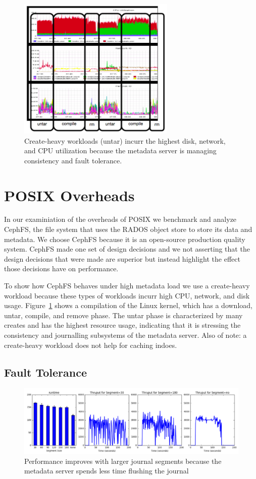\documentclass[preprint]{sigplanconf-eurosys}
\begin{document}
\begin{figure}[tb]
\centering
\includegraphics[width=75mm]{figures/creates-motivation.png}
\caption{Create-heavy workloads (untar) incurr the highest disk, network, and CPU
utilization because the metadata server is managing consistency and fault
tolerance.}\label{fig:creates-motivation}
\end{figure}

\section{POSIX Overheads}

In our examiniation of the overheads of POSIX we benchmark and analyze CephFS,
the file system that uses the RADOS object store to store its data and
metadata. We choose CephFS because it is an open-source production quality
system. CephFS made one set of design decisions and we not asserting that the
design decisions that were made are superior but instead highlight the
effect those decisions have on performance.

To show how CephFS behaves under high metadata load we use a create-heavy
workload because these types of workloads incurr high CPU, network, and disk
usage.  Figure~\ref{fig:creates-motivation} shows a compilation of the Linux
kernel, which has a download, untar, compile, and remove phase. The untar phase
is characterized by many creates and has the highest resource usage, indicating
that it is stressing the consistency and journalling subsystems of the metadata
server. Also of note: a create-heavy workload does not help for caching indoes.

\subsection{Fault Tolerance}
\begin{figure}[tb]%
\centering
\includegraphics[width=180mm]{figures/throughput-journal.png}
\caption{Performance improves with larger journal segments because the metadata
server spends less time flushing the journal }\label{fig:throughput-journal}
\end{figure}
\end{document}

